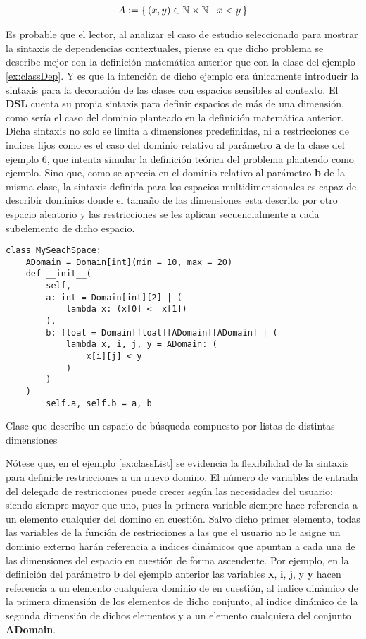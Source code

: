 \begin{align*}
    A := \{\,(x, y) \in \mathbb{N} \times \mathbb{N}\mid x < y\,\} \\
\end{align*}

Es probable que el lector, al analizar el caso de estudio seleccionado para mostrar la sintaxis de dependencias
contextuales, piense en que dicho problema se describe mejor con la definición matemática anterior que con la
clase del ejemplo \ref{ex:classDep}. Y es que la intención de dicho ejemplo era únicamente introducir la sintaxis para la decoración
de las clases con espacios sensibles al contexto. El {\bf DSL} cuenta su propia sintaxis para definir espacios de más
de una dimensión, como sería el caso del dominio planteado en la definición matemática anterior. Dicha sintaxis
no solo se limita a dimensiones predefinidas, ni a restricciones de indices fijos como es el caso del dominio relativo
al parámetro {\bf a} de la clase del ejemplo 6, que intenta simular la definición teórica del problema planteado como ejemplo.
Sino que, como se aprecia en el dominio relativo al parámetro {\bf b} de la misma clase, la sintaxis definida para los espacios
multidimensionales es capaz de describir dominios donde el tamaño de las dimensiones esta descrito por otro espacio
aleatorio y las restricciones se les aplican secuencialmente a cada subelemento de dicho espacio.


\begin{listing}[!ht]
    \begin{verbatim}
class MySeachSpace:
    ADomain = Domain[int](min = 10, max = 20)
    def __init__(
        self, 
        a: int = Domain[int][2] | (
            lambda x: (x[0] <  x[1])
        ),
        b: float = Domain[float][ADomain][ADomain] | (
            lambda x, i, j, y = ADomain: (
                x[i][j] < y
            )
        )
    )
        self.a, self.b = a, b

    \end{verbatim}
    \caption{Clase que describe un espacio de búsqueda compuesto por listas de distintas dimensiones }
    \label{ex:classList}
\end{listing}

Nótese que, en el ejemplo \ref{ex:classList} se evidencia la flexibilidad de la sintaxis para definirle restricciones a un
nuevo domino. El número de variables de entrada del delegado de restricciones puede crecer según las necesidades
del usuario; siendo siempre mayor que uno, pues la primera variable siempre hace referencia a un elemento cualquier
del domino en cuestión. Salvo dicho primer elemento, todas las variables de la función de restricciones a las que
el usuario no le asigne un dominio externo harán referencia a indices dinámicos que apuntan a cada una de las
dimensiones del espacio en cuestión de forma ascendente. Por ejemplo, en la definición del parámetro {\bf b} del
ejemplo anterior las variables {\bf x}, {\bf i}, {\bf j}, y {\bf y} hacen referencia a un elemento cualquiera
dominio de en cuestión, al indice dinámico de la primera dimensión de los elementos de dicho conjunto, al indice dinámico
de la segunda dimensión de dichos elementos y a un elemento cualquiera del conjunto {\bf ADomain}.

